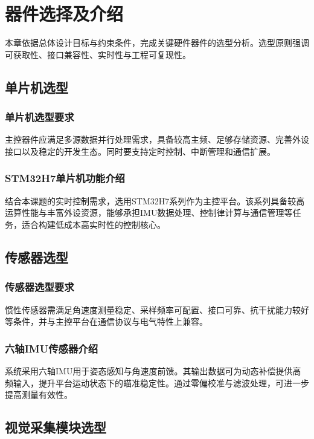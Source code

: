 \chapter{器件选择及介绍}

本章依据总体设计目标与约束条件，完成关键硬件器件的选型分析。选型原则强调可获取性、接口兼容性、实时性与工程可复现性。

\section{单片机选型}

\subsection{单片机选型要求}

主控器件应满足多源数据并行处理需求，具备较高主频、足够存储资源、完善外设接口以及稳定的开发生态。同时要支持定时控制、中断管理和通信扩展。

\subsection{STM32H7单片机功能介绍}

结合本课题的实时控制需求，选用STM32H7系列作为主控平台。该系列具备较高运算性能与丰富外设资源，能够承担IMU数据处理、控制律计算与通信管理等任务，适合构建低成本高实时性的控制核心。

\section{传感器选型}

\subsection{传感器选型要求}

惯性传感器需满足角速度测量稳定、采样频率可配置、接口可靠、抗干扰能力较好等条件，并与主控平台在通信协议与电气特性上兼容。

\subsection{六轴IMU传感器介绍}

系统采用六轴IMU用于姿态感知与角速度前馈。其输出数据可为动态补偿提供高频输入，提升平台运动状态下的瞄准稳定性。通过零偏校准与滤波处理，可进一步提高测量有效性。

\section{视觉采集模块选型}

